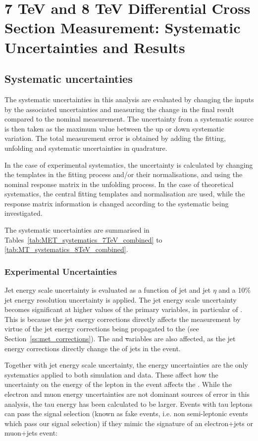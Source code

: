 \chapter{7 TeV and 8 TeV Differential Cross Section Measurement: Systematic Uncertainties and Results}
\label{c:Differential_Cross_Section:systematics_and_results}

\section{Systematic uncertainties}
\label{s:systematic_uncertainties}
The systematic uncertainties in this analysis are evaluated by changing the inputs by the associated
uncertainties and measuring the change in the final result compared to the nominal measurement. The
uncertainty from a systematic source is then taken as the maximum value between the up or down systematic
variation. The total measurement error is obtained by adding the fitting, unfolding and systematic uncertainties in
quadrature.

In the case of experimental systematics, the uncertainty is calculated by changing the templates in the
fitting process and/or their normalisations, and using the nominal \MADGRAPH response matrix in the unfolding
process. In the case of theoretical systematics, the central fitting templates and normalisation are used,
while the response matrix information is changed according to the systematic being investigated.

The systematic uncertainties are summarised in Tables~\ref{tab:MET_systematics_7TeV_combined} to
\ref{tab:MT_systematics_8TeV_combined}.

\subsection{Experimental Uncertainties}
\label{ss:experimental_uncertainties}

Jet energy scale uncertainty is evaluated as a function of jet \pt and jet $\eta$ and a 10\% jet energy
resolution uncertainty is applied. The jet energy scale uncertainty becomes significant at higher values of
the primary variables, in particular of \met. This is because the jet energy corrections directly
affects the \met measurement by virtue of the jet energy corrections being propagated to the \met (see
Section~\ref{ss:met_corrections}). The \HT and \st variables are also affected, as the jet energy corrections
directly change the \pt of jets in the event.

Together with jet energy scale uncertainty, the \met energy uncertainties are the only systematics applied to
both simulation and data. These affect how the uncertainty on the energy of the lepton in the event affects
the \met. While the electron and muon energy uncertainties are not dominant sources of error in this analysis,
the tau energy has been calculated to be larger. Events with tau leptons can pass the signal selection (known
as fake events, i.e. non semi-leptonic \ttbar events which pass our signal selection) if they mimic the
signature of an electron+jets or muon+jets \ttbar event:

